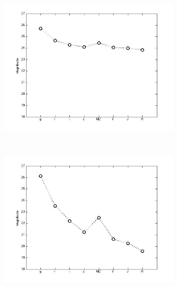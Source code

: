 \documentclass[useAMS,usenatbib,fleqn]{mn2e}
\begin{document}
\begin{figure}
\begin{subfigure}[b]{0.075\textwidth}
                \includegraphics[trim = 35px 15px 50px 25px, clip=true,width=\textwidth]{basis_07.jpg}
        \end{subfigure}
        ~
        \begin{subfigure}[b]{0.075\textwidth}
                \includegraphics[trim = 35px 15px 50px 25px, clip=true,width=\textwidth]{basis_08.jpg}
        \end{subfigure}
        ~
        \begin{subfigure}[b]{0.075\textwidth}

\end{subfigure}
\end{figure}
\end{document}
